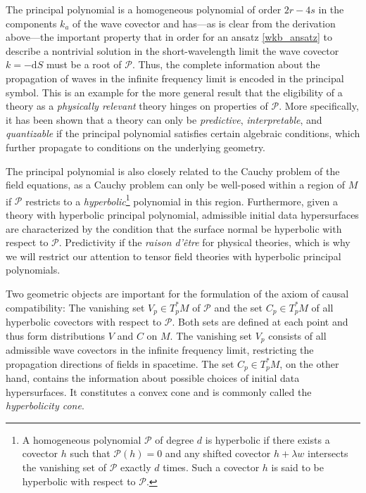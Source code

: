 The principal polynomial is a homogeneous polynomial of order $2r-4s$ in the components $k_a$ of the wave covector and has---as is clear from the derivation above---the important property that in order for an ansatz \eqref{wkb_ansatz} to describe a nontrivial solution in the short-wavelength limit the wave covector $k=-\mathrm dS$ must be a root of $\mathcal P$. Thus, the complete information about the propagation of waves in the infinite frequency limit is encoded in the principal symbol. This is an example for the more general result that the eligibility of a theory as a \emph{physically relevant} theory hinges on properties of $\mathcal P$. More specifically, it has been shown that a theory can only be \emph{predictive}, \emph{interpretable}, and \emph{quantizable} if the principal polynomial satisfies certain algebraic conditions, which further propagate to conditions on the underlying geometry.\cite{R_tzel_2011,Rivera_2012}

The principal polynomial is also closely related to the Cauchy problem of the field equations, as a Cauchy problem can only be well-posed within a region of $M$ if $\mathcal P$ restricts to a \emph{hyperbolic}\footnote{A homogeneous polynomial $\mathcal P$ of degree $d$ is hyperbolic if there exists a covector $h$ such that $\mathcal P(h)=0$ and any shifted covector $h+\lambda w$ intersects the vanishing set of $\mathcal P$ exactly $d$ times. Such a covector $h$ is said to be hyperbolic with respect to $\mathcal P$.} polynomial in this region. Furthermore, given a theory with hyperbolic principal polynomial, admissible initial data hypersurfaces are characterized by the condition that the surface normal be hyperbolic with respect to $\mathcal P$.\cite{hörmander,ivrii} Predictivity if the \emph{raison d'\^etre} for physical theories, which is why we will restrict our attention to tensor field theories with hyperbolic principal polynomials.

Two geometric objects are important for the formulation of the axiom of causal compatibility: The vanishing set $V_p\in T_p^\ast M$ of $\mathcal P$ and the set $C_p\in T_p^\ast M$ of all hyperbolic covectors with respect to $\mathcal P$. Both sets are defined at each point and thus form distributions $V$ and $C$ on $M$. The vanishing set $V_p$ consists of all admissible wave covectors in the infinite frequency limit, restricting the propagation directions of fields in spacetime. The set $C_p\in T_p^\ast M$, on the other hand, contains the information about possible choices of initial data hypersurfaces. It constitutes a convex cone\cite{garding} and is commonly called the \emph{hyperbolicity cone}\cite{R_tzel_2011,Rivera_2012}.

